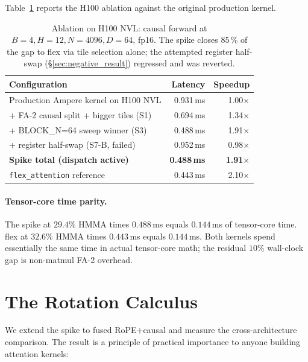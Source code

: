 \documentclass[10pt,twocolumn]{article}
\begin{document}
Table~\ref{tab:hopper_ablation} reports the H100 ablation against
the original production kernel.

\begin{table}[H]
\centering\small
\begin{tabular}{lrr}
\toprule
\textbf{Configuration} & \textbf{Latency} & \textbf{Speedup} \\
\midrule
Production Ampere kernel on H100 NVL & 0.931\,ms & 1.00$\times$ \\
+ FA-2 causal split + bigger tiles (S1)  & 0.694\,ms & 1.34$\times$ \\
+ BLOCK\_N=64 sweep winner (S3)  & 0.488\,ms & 1.91$\times$ \\
\quad + register half-swap (S7-B, failed) & 0.952\,ms & 0.98$\times$ \\
\textbf{Spike total (dispatch active)}    & \textbf{0.488\,ms} & \textbf{1.91$\times$} \\
\midrule
\texttt{flex\_attention} reference        & 0.443\,ms & 2.10$\times$ \\
\bottomrule
\end{tabular}
\caption{Ablation on H100 NVL: causal forward at
$B{=}4, H{=}12, N{=}4096, D{=}64$, fp16. The spike closes 85\,\% of
the gap to flex via tile selection alone; the attempted register
half-swap (\S\ref{sec:negative_result}) regressed and was reverted.}
\label{tab:hopper_ablation}
\end{table}

\paragraph{Tensor-core time parity.} The spike at $29.4\%$ HMMA
times $0.488\,$ms equals $0.144\,$ms of tensor-core time. flex at
$32.6\%$ HMMA times $0.443\,$ms equals $0.144\,$ms. Both kernels
spend essentially the same time in actual tensor-core math; the
residual $10\%$ wall-clock gap is non-matmul FA-2 overhead.

\section{The Rotation Calculus}
\label{sec:rotation_calculus}

We extend the spike to fused RoPE+causal and measure the
cross-architecture comparison. The result is a principle of
practical importance to anyone building attention kernels:
\end{document}
